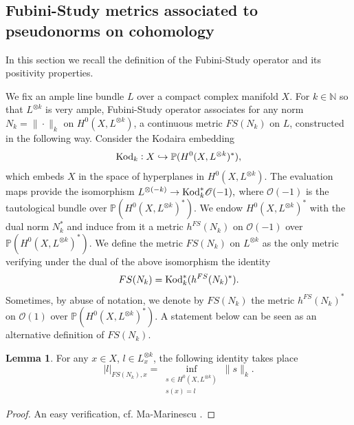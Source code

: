 \documentclass[12pt]{article}
\numberwithin{equation}{section}
\theoremstyle{theorem}
\theoremstyle{definition}
\newtheorem{lem}[thm]{Lemma}
\theoremstyle{remark}
\newcommand{\nat}{\mathbb{N}}
\begin{document}
	\subsection{Fubini-Study metrics associated to pseudonorms on cohomology}\label{sec_fs_bdem}
	
	\begin{sloppypar}
	In this section we recall the definition of the Fubini-Study operator and its positivity properties.
	\par 
	We fix an ample line bundle $L$ over a compact complex manifold $X$.
	For $k \in \nat$ so that $L^{\otimes k}$ is very ample, Fubini-Study operator associates for any norm $N_k = \| \cdot \|_k$ on $H^0(X, L^{\otimes k})$, a continuous metric $FS(N_k)$ on $L$, constructed in the following way.
	Consider the Kodaira embedding 
	\begin{equation}\label{eq_kod}
		{\rm{Kod}}_k : X \hookrightarrow \mathbb{P}(H^0(X, L^{\otimes k})^*),
	\end{equation}
	which embeds $X$ in the space of hyperplanes in $H^0(X, L^{\otimes k})$.
	The evaluation maps provide the isomorphism $
		L^{\otimes (-k)} \to {\rm{Kod}}_k^* \mathscr{O}(-1),
	$
	where $\mathscr{O}(-1)$ is the tautological bundle over $\mathbb{P}(H^0(X, L^{\otimes k})^*)$.
	We endow $H^0(X, L^{\otimes k})^*$ with the dual norm $N_k^*$ and induce from it a metric $h^{FS}(N_k)$ on $\mathscr{O}(-1)$ over $\mathbb{P}(H^0(X, L^{\otimes k})^*)$. 
	We define the metric $FS(N_k)$ on $L^{\otimes k}$ as the only metric verifying under the dual of the above isomorphism the identity
	\begin{equation}\label{eq_fs_defn}
		FS(N_k) = {\rm{Kod}}_k^* ( h^{FS}(N_k)^* ).
	\end{equation}
	Sometimes, by abuse of notation, we denote by $FS(N_k)$ the metric $h^{FS}(N_k)^*$ on $\mathscr{O}(1)$ over $\mathbb{P}(H^0(X, L^{\otimes k})^*)$.
	A statement below can be seen as an alternative definition of $FS(N_k)$.
	\end{sloppypar}
	\begin{lem}\label{lem_fs_inf_d}
		For any $x \in X$, $l \in L^{\otimes k}_x$, the following identity takes place
		\begin{equation}\label{eq_fs_norm}
			|l|_{FS(N_k), x}
			=
			\inf_{\substack{s \in H^0(X, L^{\otimes k}) \\ s(x) = l}}
			\| s \|_k.
		\end{equation}
	\end{lem}
	\begin{proof}
		An easy verification, cf. Ma-Marinescu \cite[Theorem 5.1.3]{MaHol}.
	\end{proof}
\end{document}

